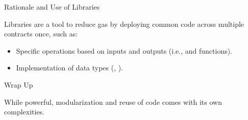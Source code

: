 \documentclass[handout]{beamer}
\begin{document}
\begin{frame}{Rationale and Use of Libraries}

Libraries are a tool to reduce gas by deploying common code across multiple contracts once, such as:
\vspace{0.5em}
\begin{itemize}
	\item	Specific operations based on inputs and outputs (i.e.,  and  functions).
	\item	Implementation of data types (, ).
\end{itemize}
\vspace{1em}



\end{frame}


\begin{frame}{Wrap Up}
	
While powerful, modularization and reuse of code comes with its own complexities.

\vspace{0.5em}

\vspace{0.5em}

\end{frame}
\end{document}
